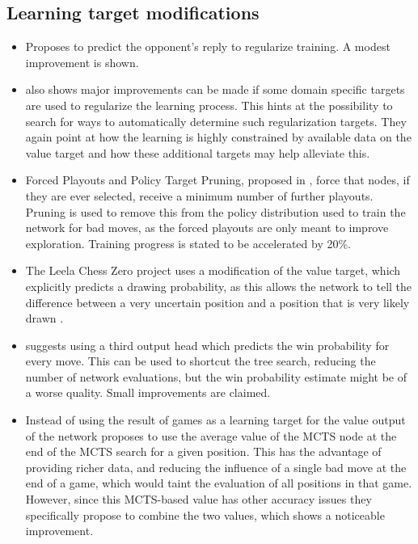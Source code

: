 \documentclass[12pt,onecolumn,oneside,titlepage]{article}
\begin{document}
\subsection{Learning target modifications}

\begin{itemize}
 \item \cite{wu2019accelerating} Proposes to predict the opponent's reply to regularize training. A modest improvement is shown.
 \item \cite{wu2019accelerating} also shows major improvements can be made if some domain specific targets are used to regularize the learning process. This hints at the possibility to search for ways to automatically determine such regularization targets.
 They again point at how the learning is highly constrained by available data on the value target and how these additional targets may help alleviate this.
 \item Forced Playouts and Policy Target Pruning, proposed in \cite{wu2019accelerating}, force that nodes, if they are ever selected, receive a minimum number of further playouts. Pruning is used to remove this from the policy distribution used to train the network for bad moves,
 as the forced playouts are only meant to improve exploration. Training progress is stated to be accelerated by 20\%.
 \item The Leela Chess Zero project uses a modification of the value target, which explicitly predicts a drawing probability, as this allows the network to tell the difference between a very uncertain position and a position that is very likely drawn \cite{leela0wdl}.
 \item \cite{anonymous2020threehead} suggests using a third output head which predicts the win probability for every move. This can be used to shortcut the tree search, reducing the number of network evaluations, but the win probability estimate might be of a worse quality.
  Small improvements are claimed.
 \item Instead of using the result of games as a learning target for the value output of the network \cite{oracledevs6} proposes to use the average value of the MCTS node at the end of the MCTS search for a given position. This has the advantage of providing richer data,
 and reducing the influence of a single bad move at the end of a game, which would taint the evaluation of all positions in that game. However, since this MCTS-based value has other accuracy issues they specifically propose to combine the two values, which shows a noticeable improvement.
\end{itemize}
\end{document}
